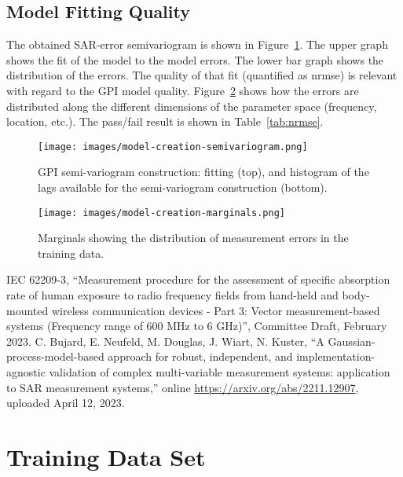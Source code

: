 \documentclass{article}
\begin{document}
\FloatBarrier
\subsection{Model Fitting Quality}
The obtained SAR-error semivariogram is shown in Figure~\ref{fig:creation-variogram}. The upper graph shows the fit of the model to the model errors. The lower bar graph shows the distribution of the errors. The quality of that fit (quantified as nrmse) is relevant with regard to the GPI model quality. Figure~\ref{fig:creation-marginals} shows how the errors are distributed along the different dimensions of the parameter space (frequency, location, etc.). The pass/fail result is shown in Table~\ref{tab:nrmse}.




\begin{figure} \centering
\texttt{[image: images/model-creation-semivariogram.png]}
\caption{GPI semi-variogram construction: fitting (top), and histogram of the lags available for the semi-variogram construction (bottom).} \label{fig:creation-variogram}
\end{figure}

\begin{figure} \centering
\texttt{[image: images/model-creation-marginals.png]}
\caption{Marginals showing the distribution of measurement errors in the training data.} \label{fig:creation-marginals}
\end{figure}

\FloatBarrier
\begin{thebibliography}{9}
IEC 62209-3, ``Measurement procedure for the assessment of specific absorption rate of human exposure to radio frequency fields from hand-held and body-mounted wireless communication devices - Part 3: Vector measurement-based systems (Frequency range of 600 MHz to 6 GHz)'', Committee Draft, February 2023.
C. Bujard, E. Neufeld, M. Douglas, J. Wiart, N. Kuster, ``A Gaussian-process-model-based approach for robust, independent, and implementation-agnostic validation of complex multi-variable measurement systems: application to SAR measurement systems,'' online \url{https://arxiv.org/abs/2211.12907}, uploaded April 12, 2023.
\end{thebibliography}

\FloatBarrier
\appendix
\section{Training Data Set} \label{sec:training-data}


\end{document}

